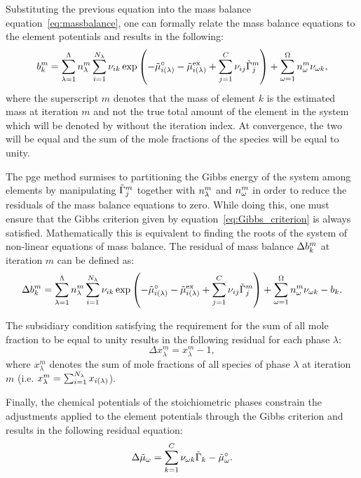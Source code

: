 Substituting the previous equation into the mass balance equation~\eqref{eq:massbalance}, one can formally relate the mass balance equations to the element potentials and results in the following:
    \begin{equation}
        \moleelem{k}^m = \sumsolnphase \molesol^m \sumspecies \stoich{i}{k} \exp{\left(-\pmgref{i} - \pmgex{i} +  \sumelements \stoich{i}{j} \cpe{j}^m\right)} + \sumstoichphase \molestoich^m \stoich{\omega}{k},
    \end{equation}
where the superscript $m$ denotes that the mass of element $k$ is the estimated mass at iteration $m$ and not the true total amount of the element in the system which will be denoted by  without the iteration index. At convergence, the two will be equal and the sum of the mole fractions of the species  will be equal to unity.

The \gls{pge} method surmises to partitioning the Gibbs energy of the system among elements by manipulating $\cpe{j}^m$ together with $\molesol^m$
and $\molestoich^m$ in order to reduce the residuals of the mass balance equations to zero. While doing this, one must ensure that the Gibbs criterion given by equation~\eqref{eq:Gibbs_criterion} is always satisfied. Mathematically this is equivalent to finding the roots of the system of non-linear equations of mass balance. The residual of mass balance $\Delta\moleelem{k}^m$ at iteration $m$ can be defined as:
    \begin{equation}\label{eq:residual_b}
        \Delta\moleelem{k}^m = \sumsolnphase \molesol^m \sumspecies \stoich{i}{k} \exp{\left(-\pmgref{i} - \pmgex{i} +  \sumelements \stoich{i}{j} \cpe{j}^m\right)} + \sumstoichphase \molestoich^m \stoich{\omega}{k} - \moleelem{k}.
    \end{equation}

The subsidiary condition satisfying the requirement for the sum of all mole fraction to be equal to unity results in the following residual for each phase $\lambda$:
    \begin{equation}\label{eq:residual_x}
        \Delta x_\lambda^m = x_\lambda^m - 1,
    \end{equation}
where $x_\lambda^m$ denotes the sum of mole fractions of all species of phase $\lambda$ at iteration $m$ (i.e. $x_\lambda^m = \sumspecies \molefrac{i}$).

Finally, the chemical potentials of the stoichiometric phases constrain the adjustments applied to the element potentials through the Gibbs criterion and results in the following residual equation:
    \begin{equation}\label{eq:residual_mu}
        \Delta\cpst = \sumelements[k] \stoich{\omega}{k} \cpe{k} - \pmgrefst.
    \end{equation}

